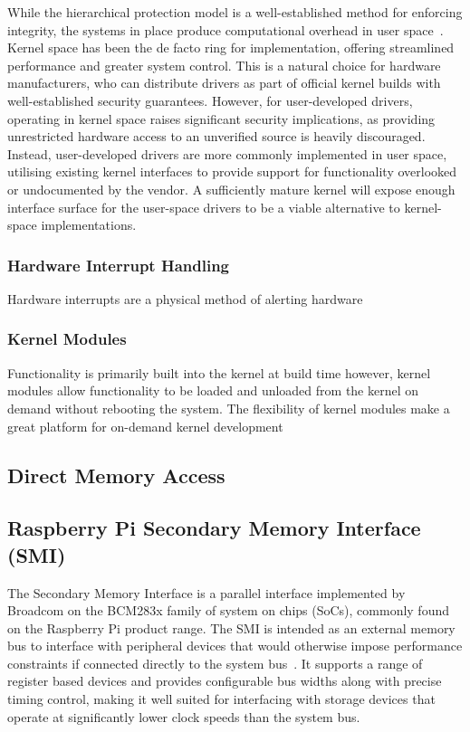 \documentclass[final]{cmpreport}
\begin{document}
While the hierarchical protection model is a well-established method for enforcing integrity, the systems in place produce computational overhead in user space~\cite{minghaoPerformanceAnalysisOptimization2007}. Kernel space has been the de facto ring for implementation, offering streamlined performance and greater system control. This is a natural choice for hardware manufacturers, who can distribute drivers as part of official kernel builds with well-established security guarantees. However, for user-developed drivers, operating in kernel space raises significant security implications, as providing unrestricted hardware access to an unverified source is heavily discouraged. Instead, user-developed drivers are more commonly implemented in user space, utilising existing kernel interfaces to provide support for functionality overlooked or undocumented by the vendor. A sufficiently mature kernel will expose enough interface surface for the user-space drivers to be a viable alternative to kernel-space implementations.

\subsubsection{Hardware Interrupt Handling}
Hardware interrupts are a physical method of alerting hardware 

\subsubsection{Kernel Modules}
Functionality is primarily built into the kernel at build time however, kernel modules allow functionality to be loaded and unloaded from the kernel on demand without rebooting the system. The flexibility of kernel modules make a great platform for on-demand kernel development

\subsection{Direct Memory Access}

\subsection{Raspberry Pi Secondary Memory Interface (SMI)}
The Secondary Memory Interface is a parallel interface implemented by Broadcom on the BCM283x family of system on chips (SoCs), commonly found on the Raspberry Pi product range. The SMI is intended as an external memory bus to interface with peripheral devices that would otherwise impose performance constraints if connected directly to the system bus~\cite{zotero-item-12}. It supports a range of register based devices and provides configurable bus widths along with precise timing control, making it well suited for interfacing with storage devices that operate at significantly lower clock speeds than the system bus.
\end{document}
